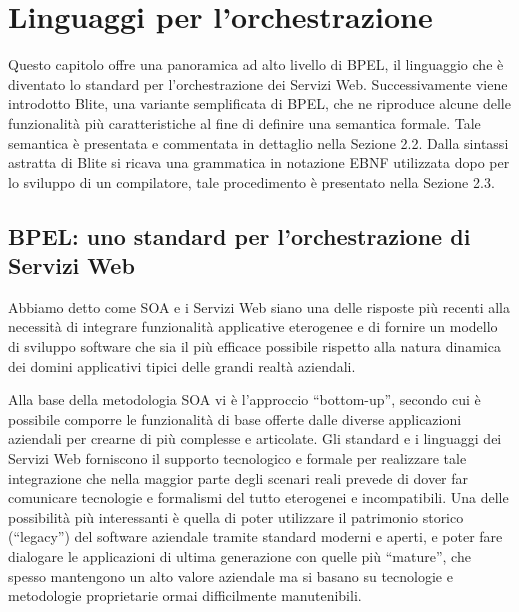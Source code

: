 \chapter{Linguaggi per l'orchestrazione}

Questo capitolo offre una panoramica ad alto livello di BPEL, il
linguaggio che è diventato lo standard per l'orchestrazione dei Servizi Web.
Successivamente viene introdotto Blite, una variante semplificata di
BPEL, che ne riproduce alcune delle funzionalità più caratteristiche al fine
di definire una semantica formale. Tale semantica è presentata e commentata in
dettaglio nella Sezione 2.2. Dalla sintassi astratta di Blite si ricava una
grammatica in notazione EBNF utilizzata dopo per lo sviluppo di un compilatore,
tale procedimento è presentato nella Sezione 2.3.

\section{BPEL: uno standard per l'orchestrazione di Servizi Web}

Abbiamo detto come SOA e i Servizi Web siano una delle risposte più recenti
alla necessità di integrare funzionalità applicative eterogenee e di fornire
un modello di sviluppo software che sia il pi\`u efficace possibile rispetto
alla natura dinamica dei domini applicativi tipici delle grandi realtà
aziendali.

Alla base della metodologia SOA vi è l'approccio ``bottom-up'', secondo cui è
possibile comporre le funzionalità di base offerte dalle diverse applicazioni
aziendali per crearne di più complesse e articolate. Gli standard e i linguaggi
dei Servizi Web forniscono il supporto tecnologico e formale per realizzare tale
integrazione che nella maggior parte degli scenari reali prevede di dover far
comunicare tecnologie e formalismi del tutto eterogenei e incompatibili. Una delle
possibilità più interessanti è quella di poter utilizzare il patrimonio storico
(``legacy'') del software aziendale tramite standard moderni e aperti, e poter
fare dialogare le applicazioni di ultima generazione con quelle più ``mature'',
che spesso mantengono un alto valore aziendale ma si basano su tecnologie e
metodologie proprietarie ormai difficilmente manutenibili.

